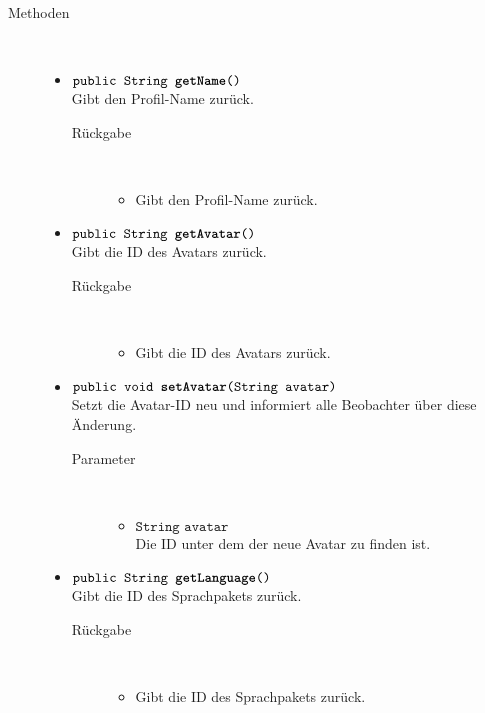 \begin{description}
\item[Methoden] \hfill \\
	\vspace{-.8cm}
	\begin{itemize}
		\item $\texttt{public String \textbf{getName}()}$ \\ Gibt den Profil-Name zurück.
		\begin{description}
			\item[Rückgabe] \hfill \\
			\vspace{-.8cm}
			\begin{itemize}
				\item Gibt den Profil-Name zurück.
			\end{itemize}
		\end{description}
		
		\item $\texttt{public String \textbf{getAvatar}()}$ \\ Gibt die ID des Avatars zurück.
		\begin{description}
			\item[Rückgabe] \hfill \\
			\vspace{-.8cm}
			\begin{itemize}
				\item Gibt die ID des Avatars zurück.
			\end{itemize}
		\end{description}
		
		\item $\texttt{public void \textbf{setAvatar}(String avatar)}$ \\ Setzt die Avatar-ID neu und informiert alle Beobachter über diese Änderung.
		\begin{description}
			\item[Parameter] \hfill \\
			\vspace{-.8cm}
			\begin{itemize}
				\item $\texttt{String avatar}$ \\ Die ID unter dem der neue Avatar zu finden ist.
			\end{itemize}
		\end{description}
		
		\item $\texttt{public String \textbf{getLanguage}()}$ \\ Gibt die ID des Sprachpakets zurück.
		\begin{description}
			\item[Rückgabe] \hfill \\
			\vspace{-.8cm}
			\begin{itemize}
				\item Gibt die ID des Sprachpakets zurück.
			\end{itemize}
		\end{description}
		

\end{itemize}
\end{description}
